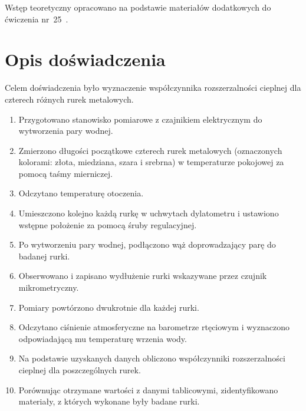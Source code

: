 \documentclass[a4paper,12pt]{article}
\begin{document}
Wstęp teoretyczny opracowano na podstawie materiałów dodatkowych do ćwiczenia nr~25~\cite{lab-25-wstep}.

\section{Opis doświadczenia}


Celem doświadczenia było wyznaczenie współczynnika rozszerzalności cieplnej dla czterech różnych rurek metalowych.

\begin{enumerate}
    \item Przygotowano stanowisko pomiarowe z czajnikiem elektrycznym do wytworzenia pary wodnej.

    \item Zmierzono długości początkowe czterech rurek metalowych (oznaczonych kolorami: złota, miedziana, szara i srebrna) w temperaturze pokojowej za pomocą taśmy mierniczej.

    \item Odczytano temperaturę otoczenia.

    \item Umieszczono kolejno każdą rurkę w uchwytach dylatometru i ustawiono wstępne położenie za pomocą śruby regulacyjnej.

    \item Po wytworzeniu pary wodnej, podłączono wąż doprowadzający parę do badanej rurki.

    \item Obserwowano i zapisano wydłużenie rurki wskazywane przez czujnik mikrometryczny.

    \item Pomiary powtórzono dwukrotnie dla każdej rurki.

    \item Odczytano ciśnienie atmosferyczne na barometrze rtęciowym i wyznaczono odpowiadającą mu temperaturę wrzenia wody.

    \item Na podstawie uzyskanych danych obliczono współczynniki rozszerzalności cieplnej dla poszczególnych rurek.

    \item Porównując otrzymane wartości z danymi tablicowymi, zidentyfikowano materiały, z których wykonane były badane rurki.
\end{enumerate}



\end{document}
